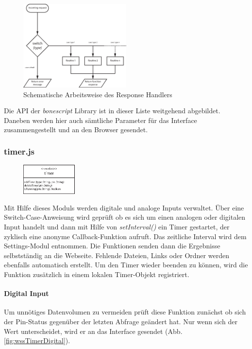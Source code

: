 \begin{figure}[ht]
  \centering
  \includegraphics[width = 0.5\textwidth]{documentation/images/wssResponseHandler.eps}
  \caption{Schematische Arbeitsweise des Response Handlers}
  \label{fig:wssResponseHandler}
\end{figure}

Die API der \textit{bonescript} Library ist in dieser Liste weitgehend abgebildet. Daneben werden hier auch sämtliche Parameter für das Interface zusammengestellt und an den Browser gesendet.

\subsubsection{timer.js}
\begin{figure}
  \vspace{-16pt}
  \centering
  \includegraphics[width = 0.25\textwidth]{documentation/images/apiTimer.eps}
\end{figure}

Mit Hilfe dieses Moduls werden digitale und analoge Inputs verwaltet. Über eine Switch-Case-Anweisung wird geprüft ob es sich um einen analogen oder digitalen Input handelt und dann mit Hilfe von \textit{setInterval()} ein Timer gestartet, der zyklisch eine anonyme Callback-Funktion aufruft. Das zeitliche Interval wird dem Settings-Modul entnommen. Die Funktionen senden dann die Ergebnisse selbstständig an die Webseite. Fehlende Dateien, Links oder Ordner werden ebenfalls automatisch erstellt. Um den Timer wieder beenden zu können, wird die Funktion zusätzlich in einem lokalen Timer-Objekt registriert.

\paragraph{Digital Input} Um unnötiges Datenvolumen zu vermeiden prüft diese Funktion zunächst ob sich der Pin-Status gegenüber der letzten Abfrage geändert hat. Nur wenn sich der Wert unterscheidet, wird er an das Interface gesendet (Abb. \ref{fig:wssTimerDigital}).

